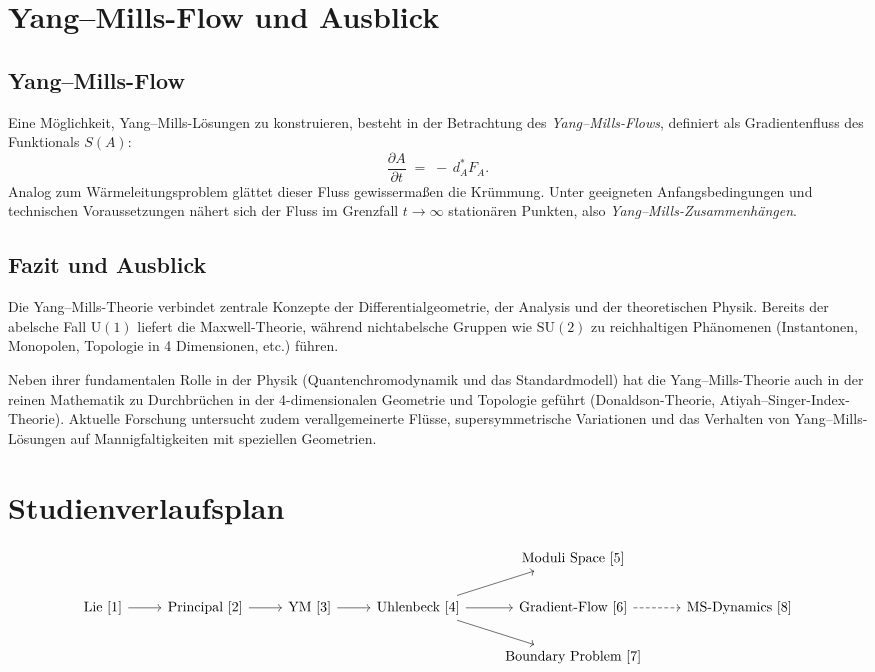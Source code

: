 \documentclass[10pt, letterpaper]{article}
\begin{document}
\section{Yang--Mills-Flow und Ausblick}
\subsection{Yang--Mills-Flow}
Eine Möglichkeit, Yang--Mills-Lösungen zu konstruieren, besteht in der Betrachtung des \emph{Yang--Mills-Flows}, definiert als Gradientenfluss des Funktionals \(S(A)\):
\[
\frac{\partial A}{\partial t}
\;=\;
-\, d_A^* F_A.
\]
Analog zum Wärmeleitungsproblem glättet dieser Fluss gewissermaßen die Krümmung. Unter geeigneten Anfangsbedingungen und technischen Voraussetzungen nähert sich der Fluss im Grenzfall \(t\to\infty\) stationären Punkten, also \emph{Yang--Mills-Zusammenhängen}.

\subsection{Fazit und Ausblick}
Die Yang--Mills-Theorie verbindet zentrale Konzepte der Differentialgeometrie, der Analysis und der theoretischen Physik. Bereits der abelsche Fall \(\mathrm{U}(1)\) liefert die Maxwell-Theorie, während nichtabelsche Gruppen wie \(\mathrm{SU}(2)\) zu reichhaltigen Phänomenen (Instantonen, Monopolen, Topologie in 4 Dimensionen, etc.) führen.  

Neben ihrer fundamentalen Rolle in der Physik (Quantenchromodynamik und das Standardmodell) hat die Yang--Mills-Theorie auch in der reinen Mathematik zu Durchbrüchen in der 4-dimensionalen Geometrie und Topologie geführt (Donaldson-Theorie, Atiyah--Singer-Index-Theorie). Aktuelle Forschung untersucht zudem verallgemeinerte Flüsse, supersymmetrische Variationen und das Verhalten von Yang--Mills-Lösungen auf Mannigfaltigkeiten mit speziellen Geometrien.








\pagebreak



\section{Studienverlaufsplan}

{\small
\[
\begin{tikzcd}
& & & & \text{Moduli Space [5]} \\
\text{Lie [1]} \arrow[r] & \text{Principal [2]} \arrow[r] & \text{YM [3]} \arrow[r] &  \text{Uhlenbeck [4]} \arrow[r]\arrow[ru]\arrow[rd] & \text{Gradient-Flow [6]} \arrow[r,dashed] & \text{MS-Dynamics [8]} \\
& & & & \text{Boundary Problem [7]}\\
\end{tikzcd}
\]
}
\end{document}
